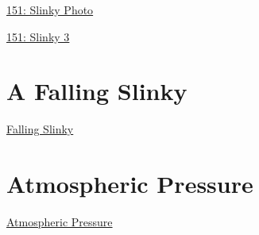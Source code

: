\documentclass{ximera}
\begin{document}
\href{https://www.desmos.com/calculator/zqjjgael5j}{151: Slinky Photo}



\begin{onlineOnly}
    \begin{center}
\end{center}
\end{onlineOnly}

\href{https://www.desmos.com/calculator/ew24lplwqf}{151: Slinky 3}



\section{A Falling Slinky}

\href{https://www.youtube.com/watch?v=eCMmmEEyOO0}{Falling Slinky}


\section{Atmospheric Pressure}

\href{https://projects.iq.harvard.edu/files/acmg/files/intro_atmo_chem_bookchap2.pdf}{Atmospheric Pressure} 
\end{document}
